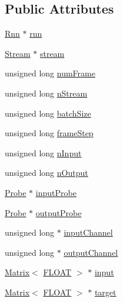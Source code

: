 \subsection*{Public Attributes}
\begin{DoxyCompactItemize}
\item 
\hyperlink{classfractal_1_1Rnn}{Rnn} $\ast$ \hyperlink{classfractal_1_1BackpropArgs_a97feb3d265db3976066700f99b657e42}{rnn}
\item 
\hyperlink{classfractal_1_1Stream}{Stream} $\ast$ \hyperlink{classfractal_1_1BackpropArgs_a16eae72910a2734b8857e02dbd15f06e}{stream}
\item 
unsigned long \hyperlink{classfractal_1_1BackpropArgs_ad9048cb8bd18097e49b46ab0bd7e7a76}{num\+Frame}
\item 
unsigned long \hyperlink{classfractal_1_1BackpropArgs_a3c715a926b61b851683280a0fd14c6b8}{n\+Stream}
\item 
unsigned long \hyperlink{classfractal_1_1BackpropArgs_ae346e9a842f88c30daa10d6edbc30bf4}{batch\+Size}
\item 
unsigned long \hyperlink{classfractal_1_1BackpropArgs_ae78c53109f97e43a3f4b167e6b562653}{frame\+Step}
\item 
unsigned long \hyperlink{classfractal_1_1BackpropArgs_a739d6ed1aa4132bd9fb18606fa1e1a17}{n\+Input}
\item 
unsigned long \hyperlink{classfractal_1_1BackpropArgs_a7b30c33f1ae37ce7e3b193a1560a292d}{n\+Output}
\item 
\hyperlink{classfractal_1_1Probe}{Probe} $\ast$ \hyperlink{classfractal_1_1BackpropArgs_a18a7ad6ff596d8f16388dae85d07794c}{input\+Probe}
\item 
\hyperlink{classfractal_1_1Probe}{Probe} $\ast$ \hyperlink{classfractal_1_1BackpropArgs_ae073c7cdaf8f81c9b634ce52e1bcf69a}{output\+Probe}
\item 
unsigned long $\ast$ \hyperlink{classfractal_1_1BackpropArgs_a054d628aec63cc312e2e211406fefd69}{input\+Channel}
\item 
unsigned long $\ast$ \hyperlink{classfractal_1_1BackpropArgs_aba9fc480f23686a563ceae2889660c23}{output\+Channel}
\item 
\hyperlink{classfractal_1_1Matrix}{Matrix}$<$ \hyperlink{namespacefractal_a1c2d2530689575d5ccb56bae52af70d3}{F\+L\+O\+A\+T} $>$ $\ast$ \hyperlink{classfractal_1_1BackpropArgs_a4e54ce09681eabdfad307e202a352fe8}{input}
\item 
\hyperlink{classfractal_1_1Matrix}{Matrix}$<$ \hyperlink{namespacefractal_a1c2d2530689575d5ccb56bae52af70d3}{F\+L\+O\+A\+T} $>$ $\ast$ \hyperlink{classfractal_1_1BackpropArgs_a7940fb93db22188b97167905155fdc44}{target}
\end{DoxyCompactItemize}


